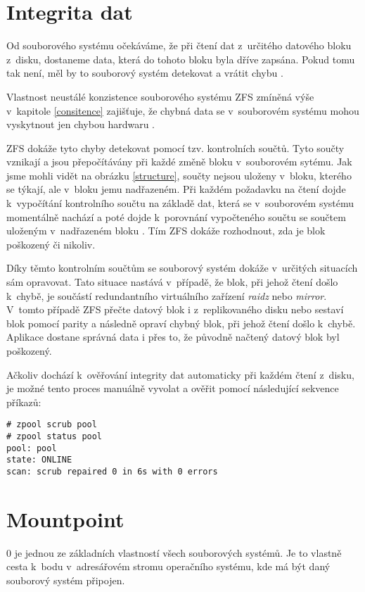 \section{Integrita dat}
\label{checksum}
Od souborového systému očekáváme, že při čtení dat z~určitého datového bloku z~disku, dostaneme data, která do tohoto bloku byla dříve zapsána. Pokud tomu tak není, měl by to souborový systém detekovat a vrátit chybu \cite{integrity1}.

Vlastnost neustálé konzistence souborového systému ZFS zmíněná výše v~kapitole \ref{consitence} zajišťuje, že chybná data se v~souborovém systému mohou vyskytnout jen chybou hardwaru \cite{integrity2}.

ZFS dokáže tyto chyby detekovat pomocí tzv. kontrolních součtů. Tyto součty vznikají a jsou přepočítávány při každé změně bloku v~souborovém sytému. Jak jsme mohli vidět na obrázku \ref{structure}, součty nejsou uloženy v~bloku, kterého se týkají, ale v~bloku jemu nadřazeném. Při každém požadavku na čtení dojde k~vypočítání kontrolního součtu na základě dat, která se v~souborovém systému momentálně nachází a poté dojde k~porovnání vypočteného součtu se součtem uloženým v~nadřazeném bloku \cite{integrity1}. Tím ZFS dokáže rozhodnout, zda je blok poškozený či nikoliv.

Díky těmto kontrolním součtům se souborový systém dokáže v~určitých situacích sám opravovat. Tato situace nastává v~případě, že blok, při jehož čtení došlo k~chybě, je součástí redundantního virtuálního zařízení \emph{raidz} nebo \emph{mirror}. V~tomto případě ZFS přečte datový blok i z~replikovaného disku nebo sestaví blok pomocí parity a následně opraví chybný blok, při jehož čtení došlo k~chybě. Aplikace dostane správná data i přes to, že původně načtený datový blok byl poškozený.

Ačkoliv dochází k~ověřování integrity dat automaticky při každém čtení z~disku, je možné tento proces manuálně vyvolat a ověřit pomocí následující sekvence příkazů:
\begin{verbatim}
# zpool scrub pool
# zpool status pool
pool: pool
state: ONLINE
scan: scrub repaired 0 in 6s with 0 errors
\end{verbatim}

\section{Mountpoint}
\label{mountpoint}
0 je jednou ze základních vlastností všech souborových systémů. Je to vlastně cesta k~bodu v~adresářovém stromu operačního systému, kde má být daný souborový systém připojen.

